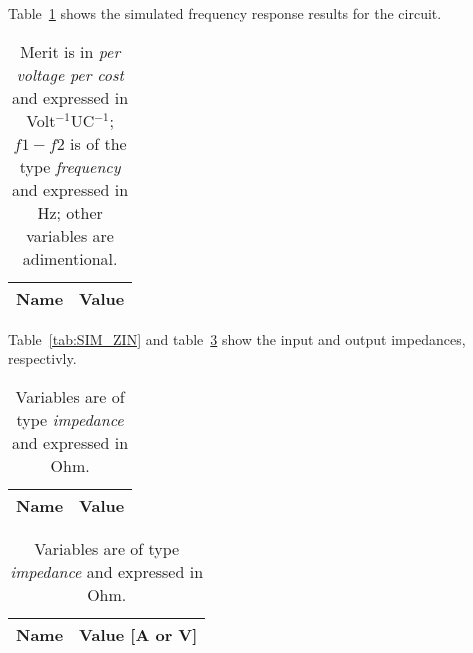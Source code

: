 Table~\ref{tab:SIM_RES} shows the simulated frequency response results for the circuit.
\begin{table}[h]
  \centering
  \begin{tabular}{|l|r|}
    \hline    
    {\bf Name} & {\bf Value} \\ \hline
    
  \end{tabular}
  \caption{Merit is in {\it per voltage per cost} and expressed in Volt$^{-1}$UC$^{-1}$; $f1 - f2$ is of the type {\it frequency} and expressed in Hz; other variables are adimentional.}
  \label{tab:SIM_RES}
\end{table}

Table~\ref{tab:SIM_ZIN} and table~\ref{tab:SIM_ZOUT} show the input and output impedances, respectivly.

\begin{table}[h]
\centering
\begin{minipage}[t]{0.50\linewidth}
 	 \begin{tabular}[t]{|l|r|}
    	\hline    
   		{\bf Name} & {\bf Value} \\ \hline
    	
  	\end{tabular}
  	\caption{ Variables are of type {\it impedance} and expressed in Ohm.}
  	\label{tab:SIM_ZIN}
\end{minipage}

\begin{minipage}[t]{0.50\linewidth}
  	\begin{tabular}[t]{|l|r|}
    	\hline    
   		{\bf Name} & {\bf Value [A or V]} \\ \hline
    	
  	\end{tabular}
	\caption{ Variables are of type {\it impedance} and expressed in Ohm.}
  	\label{tab:SIM_ZOUT}
\end{minipage}
\end{table}

